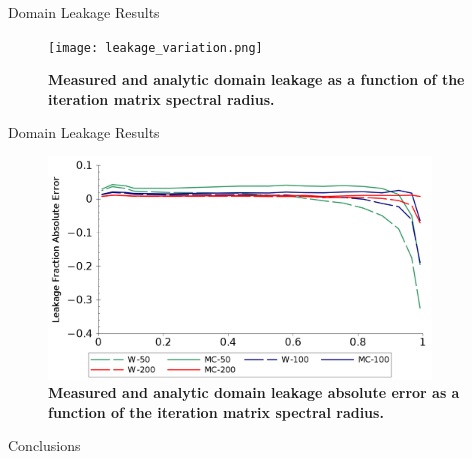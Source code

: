 \documentclass{beamer}
\begin{document}
\begin{frame}{Domain Leakage Results}

  \begin{figure}[t!]
    \begin{center}
      \texttt{[image: leakage\_variation.png]}
    \end{center}
    \caption{\textbf{Measured and analytic domain leakage as a function
        of the iteration matrix spectral radius.}}
    \label{fig:leakage_variation}
  \end{figure}

\end{frame}

\begin{frame}{Domain Leakage Results}

  \begin{figure}[ht!]
      \begin{center}
        \includegraphics[width=4.0in,clip]{leakage_error.png}
      \end{center}
      \caption{\textbf{Measured and analytic domain leakage absolute
          error as a function of the iteration matrix spectral radius.}}
      \label{fig:leakage_error}
  \end{figure}

\end{frame}

\begin{frame}{Conclusions}

\end{frame}

\end{document}
